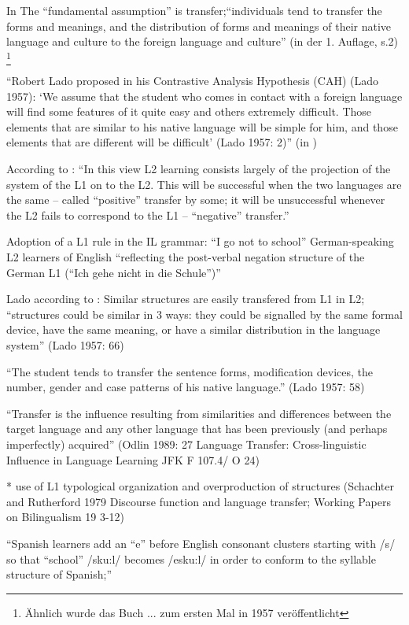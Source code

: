 In \cite{Lado71} The ``fundamental assumption'' is transfer;``individuals tend to transfer the forms and meanings, and the distribution of forms and meanings of their native language and culture to the foreign language and culture'' (in der 1. Auflage, s.2)
\footnote{Ähnlich wurde das Buch ... zum ersten Mal in 1957 veröffentlicht}

``Robert Lado proposed in his
Contrastive Analysis Hypothesis (CAH) (Lado 1957): ‘We assume that the
student who comes in contact with a foreign language will find some features
of it quite easy and others extremely difficult. Those elements that are similar
to his native language will be simple for him, and those elements that
are different will be difficult’ (Lado 1957: 2)'' (in \cite{Ellis06})


According to \cite{Cook93}: ``In this view L2 learning consists largely of the projection of the system of the L1 on to the L2.
This will be successful when the two languages are the same -- called ``positive'' transfer by some;
it will be unsuccessful whenever the L2 fails to correspond to the L1 -- ``negative'' transfer.''

\cite{Braidi99}
Adoption of a L1 rule in the IL grammar:
``I go not to school'' German-speaking L2 learners of English ``reflecting the post-verbal negation structure
of the German L1 (``Ich gehe nicht in die Schule'')''

Lado according to \cite{Braidi99}:
Similar structures are easily transfered from L1 in L2;
``structures could be similar in 3 ways: they could be signalled by the same formal device, have the same meaning,
or have a similar distribution in the language system'' (Lado 1957: 66)

``The student tends to transfer the sentence forms, modification devices, the number, gender and case patterns of
his native language.'' (Lado 1957: 58)

``Transfer is the influence resulting from similarities and differences between the target language and any other
language that has been previously (and perhaps imperfectly) acquired'' (Odlin 1989: 27 Language Transfer: Cross-linguistic Influence in Language Learning
JFK F 107.4/ O 24)

* use of L1 typological organization and overproduction of structures (Schachter and Rutherford 1979 Discourse function and language transfer; Working Papers on Bilingualism 19 3-12)


``Spanish learners add an ``e'' before English consonant clusters starting with /s/ so that ``school'' /sku:l/ becomes /esku:l/ in order to conform to the syllable structure of Spanish;'' %

